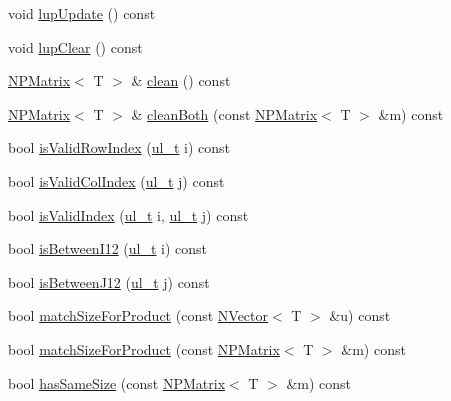 \begin{DoxyCompactItemize}
\item 
void \mbox{\hyperlink{class_n_p_matrix_ab0bb16a2c2fb70a2294eb5f64c5530df}{lup\+Update}} () const
\item 
void \mbox{\hyperlink{class_n_p_matrix_aa10cc45e0f51b547e4b9a9b89e95d007}{lup\+Clear}} () const
\item 
\mbox{\hyperlink{class_n_p_matrix}{N\+P\+Matrix}}$<$ T $>$ \& \mbox{\hyperlink{class_n_p_matrix_ad6c14f6a92b15709ddee8213067c8955}{clean}} () const
\item 
\mbox{\hyperlink{class_n_p_matrix}{N\+P\+Matrix}}$<$ T $>$ \& \mbox{\hyperlink{class_n_p_matrix_abbee6873ebebfb5080a9719e4154f638}{clean\+Both}} (const \mbox{\hyperlink{class_n_p_matrix}{N\+P\+Matrix}}$<$ T $>$ \&m) const
\item 
bool \mbox{\hyperlink{class_n_p_matrix_afc5221cb1f5d1e1919801a0ff32751fe}{is\+Valid\+Row\+Index}} (\mbox{\hyperlink{typedef_8h_a1b140a2034db3f5dfe18a987745df43a}{ul\+\_\+t}} i) const
\item 
bool \mbox{\hyperlink{class_n_p_matrix_ab3f19d6c9259ef6e0a919ea7ad85a5a1}{is\+Valid\+Col\+Index}} (\mbox{\hyperlink{typedef_8h_a1b140a2034db3f5dfe18a987745df43a}{ul\+\_\+t}} j) const
\item 
bool \mbox{\hyperlink{class_n_p_matrix_a3d584ab75f97711997f39ffefef1f78b}{is\+Valid\+Index}} (\mbox{\hyperlink{typedef_8h_a1b140a2034db3f5dfe18a987745df43a}{ul\+\_\+t}} i, \mbox{\hyperlink{typedef_8h_a1b140a2034db3f5dfe18a987745df43a}{ul\+\_\+t}} j) const
\item 
bool \mbox{\hyperlink{class_n_p_matrix_a0c1a788260180b0df60b8d049d121859}{is\+Between\+I12}} (\mbox{\hyperlink{typedef_8h_a1b140a2034db3f5dfe18a987745df43a}{ul\+\_\+t}} i) const
\item 
bool \mbox{\hyperlink{class_n_p_matrix_aeb0ca9af7c136d9ffa4d27226c922591}{is\+Between\+J12}} (\mbox{\hyperlink{typedef_8h_a1b140a2034db3f5dfe18a987745df43a}{ul\+\_\+t}} j) const
\item 
bool \mbox{\hyperlink{class_n_p_matrix_a748282f2d472970dbd20e3b2f6d62032}{match\+Size\+For\+Product}} (const \mbox{\hyperlink{class_n_vector}{N\+Vector}}$<$ T $>$ \&u) const
\item 
bool \mbox{\hyperlink{class_n_p_matrix_a568a5ab1b6f0d51b3045dc8a81666209}{match\+Size\+For\+Product}} (const \mbox{\hyperlink{class_n_p_matrix}{N\+P\+Matrix}}$<$ T $>$ \&m) const
\item 
bool \mbox{\hyperlink{class_n_p_matrix_a8293f07a744e03121a57176c97bf452b}{has\+Same\+Size}} (const \mbox{\hyperlink{class_n_p_matrix}{N\+P\+Matrix}}$<$ T $>$ \&m) const

\end{DoxyCompactItemize}
